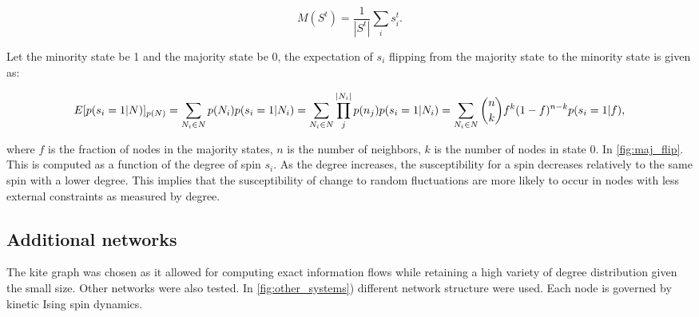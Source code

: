 \documentclass[a4paper, 11pt, twocolumn]{article}
\begin{document}
\[M(S^t) = \frac{1}{|S^t|} \sum_i s_i^t.\]

Let the minority state be 1 and the majority state be 0, the expectation
of \(s_i\) flipping from the majority state to the minority state is
given as:

\begin{dmath}[compact=-1000]
\label{eq:majority_flip}
E[ p(s_i = 1 | N ) ]_{p(N)} = \sum_{N_i \in N} p(N_i) p(s_i = 1 | N_i)\\
            = \sum_{N_i \in  N} \prod_j^{|N_i|} p(n_j) p(s_i  = 1 |N_i)\\
            =  \sum_{N_i \in N}  {n\choose k} f^k  (1  - f)^{n-k}  p(s_i  = 1 | f),
\end{dmath}

where \(f\) is the fraction of nodes in the majority states, \(n\) is
the number of neighbors, \(k\) is the number of nodes in state 0. In
\cref{fig:maj_flip}. This is computed as a function
of the degree of spin \(s_i\). As the degree increases, the
susceptibility for a spin decreases relatively to the same spin with a
lower degree. This implies that the susceptibility of change to random
fluctuations are more likely to occur in nodes with less external
constraints as measured by degree.

\subsection{Additional networks}
\label{additional-networks}
The kite graph was chosen  as it allowed for computing exact
information flows  while retaining a high  variety of degree
distribution given the small  size. Other networks were also
tested.   In  \cref{fig:other_systems})   different  network
structure were used. Each node  is governed by kinetic Ising
spin dynamics.
\end{document}
